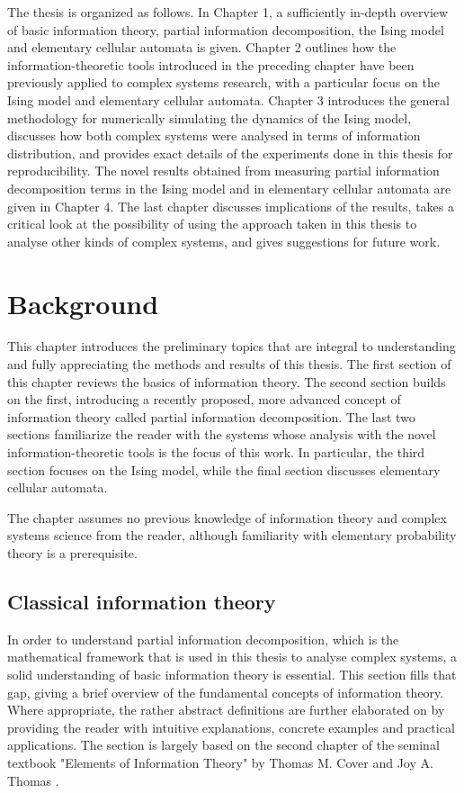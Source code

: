 \documentclass[12pt]{article}
\begin{document}
The thesis is organized as follows. In Chapter 1, a sufficiently in-depth overview of basic information theory, partial information decomposition, the Ising model and elementary cellular automata is given. Chapter 2 outlines how the information-theoretic tools introduced in the preceding chapter have been previously applied to complex systems research, with a particular focus on the Ising model and elementary cellular automata. Chapter 3 introduces the general methodology for numerically simulating the dynamics of the Ising model, discusses how both complex systems were analysed in terms of information distribution, and provides exact details of the experiments done in this thesis for reproducibility. The novel results obtained from measuring partial information decomposition terms in the Ising model and in elementary cellular automata are given in Chapter 4. The last chapter discusses implications of the results, takes a critical look at the possibility of using the approach taken in this thesis to analyse other kinds of complex systems, and gives suggestions for future work.  

\newpage

\section{Background}

This chapter introduces the preliminary topics that are integral to understanding and fully appreciating the methods and results of this thesis. The first section of this chapter reviews the basics of information theory. The second section builds on the first, introducing a recently proposed, more advanced concept of information theory called partial information decomposition. The last two sections familiarize the reader with the systems whose analysis with the novel information-theoretic tools is the focus of this work. In particular, the third section focuses on the Ising model, while the final section discusses elementary cellular automata.

The chapter assumes no previous knowledge of information theory and complex systems science from the reader, although familiarity with elementary probability theory is a prerequisite. 

\subsection{Classical information theory}

In order to understand partial information decomposition, which is the mathematical framework that is used in this thesis to analyse complex systems, a solid understanding of basic information theory is essential. This section fills that gap, giving a brief overview of the fundamental concepts of information theory. Where appropriate, the rather abstract definitions are further elaborated on by providing the reader with intuitive explanations, concrete examples and practical applications. The section is largely based on the second chapter of the seminal textbook "Elements of Information Theory" by Thomas M. Cover and Joy A. Thomas \cite{cover-thomas}.
\end{document}
